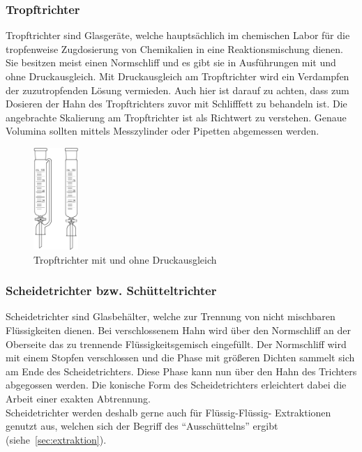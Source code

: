 \subsubsection{Tropftrichter}
Tropftrichter sind Glasgeräte, welche hauptsächlich im chemischen Labor für die tropfenweise Zugdosierung von Chemikalien in eine Reaktionsmischung dienen. Sie besitzen meist einen Normschliff und es gibt sie in Ausführungen mit und ohne Druckausgleich. Mit Druckausgleich am Tropftrichter wird ein Verdampfen der zuzutropfenden Lösung vermieden. Auch hier ist darauf zu achten, dass zum Dosieren der Hahn des Tropftrichters zuvor mit Schlifffett zu behandeln ist. Die angebrachte Skalierung am Tropftrichter ist als Richtwert zu verstehen. Genaue Volumina sollten mittels Messzylinder oder Pipetten abgemessen werden.
 \begin{figure}[h!]
 	\centering
 	\includegraphics[width=0.15\textwidth]{img/tropftrichter}
 	\caption{Tropftrichter mit und ohne Druckausgleich}
 	\label{fig:tropftrichter}
 \end{figure}
 \FloatBarrier
 \vspace{-5mm}
\subsubsection{Scheidetrichter bzw. Schütteltrichter}
Scheidetrichter sind Glasbehälter, welche zur Trennung von nicht mischbaren Flüssigkeiten dienen. Bei verschlossenem Hahn wird über den Normschliff an der Oberseite das zu trennende Flüssigkeitsgemisch eingefüllt. Der Normschliff wird mit einem Stopfen verschlossen und die Phase mit größeren Dichten sammelt sich am Ende des Scheidetrichters. Diese Phase kann nun über den Hahn des Trichters abgegossen werden. Die konische Form des Scheidetrichters erleichtert dabei die Arbeit einer exakten Abtrennung.\\
Scheidetrichter werden deshalb gerne auch für Flüssig-Flüssig- Extraktionen genutzt aus, welchen sich der Begriff des "`Ausschüttelns"' ergibt \mbox{(siehe \ref{sec:extraktion})}.


